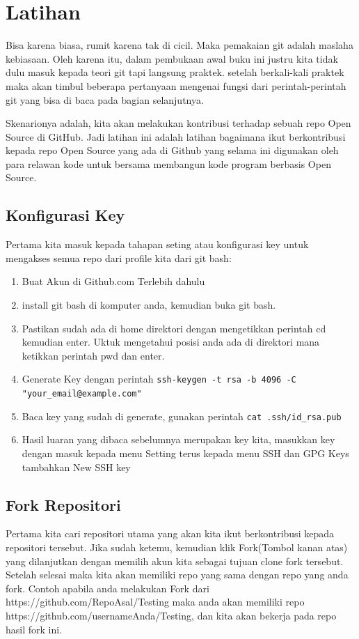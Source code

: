 \section{Latihan}
Bisa karena biasa, rumit karena tak di cicil. Maka pemakaian git adalah maslaha kebiasaan. Oleh karena itu, dalam pembukaan awal buku ini justru kita tidak dulu masuk kepada teori git tapi langsung praktek. setelah berkali-kali praktek maka akan timbul beberapa pertanyaan mengenai fungsi dari perintah-perintah git yang bisa di baca pada bagian selanjutnya.

Skenarionya adalah, kita akan melakukan kontribusi terhadap sebuah repo Open Source di GitHub. Jadi latihan ini adalah latihan bagaimana ikut berkontribusi kepada repo Open Source yang ada di Github yang selama ini digunakan oleh para relawan kode untuk bersama membangun kode program berbasis Open Source.
\subsection{Konfigurasi Key}
Pertama kita masuk kepada tahapan seting atau konfigurasi key untuk mengakses semua repo dari profile kita dari git bash:
\begin{enumerate}
\item Buat Akun di Github.com Terlebih dahulu
\item install git bash di komputer anda, kemudian buka git bash.
\item Pastikan sudah ada di home direktori dengan mengetikkan perintah cd kemudian enter. Uktuk mengetahui posisi anda ada di direktori mana ketikkan perintah pwd dan enter.
\item Generate Key dengan perintah
\verb|ssh-keygen -t rsa -b 4096 -C "your_email@example.com"|
\item Baca key yang sudah di generate, gunakan perintah
\verb|cat .ssh/id_rsa.pub|
\item Hasil luaran yang dibaca sebelumnya merupakan key kita, masukkan key dengan masuk kepada menu Setting terus kepada menu SSH dan GPG Keys tambahkan New SSH key
\end{enumerate}

\subsection{Fork Repositori}
Pertama kita cari repositori utama yang akan kita ikut berkontribusi kepada repositori tersebut. Jika sudah ketemu, kemudian klik Fork(Tombol kanan atas) yang dilanjutkan dengan memilih akun kita sebagai tujuan clone fork tersebut. Setelah selesai maka kita akan memiliki repo yang sama dengan repo yang anda fork. Contoh apabila anda melakukan Fork dari https://github.com/RepoAsal/Testing maka anda akan memiliki repo https://github.com/usernameAnda/Testing, dan kita akan bekerja pada repo hasil fork ini.

